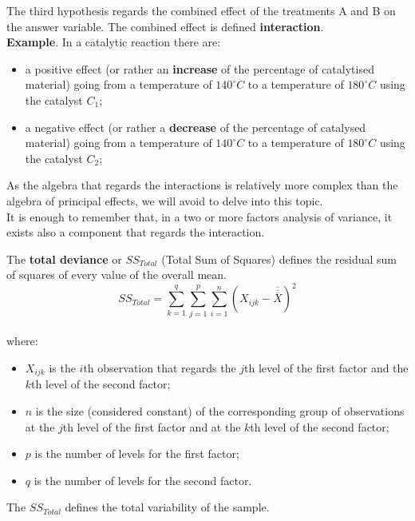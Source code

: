 \begin{frame}
  \begin{small}
    The third hypothesis regards the combined effect of the treatments A and B on the answer variable. The combined effect is defined \textbf{interaction}.\\
    \vspace*{.2cm}
    \textbf{Example}. In a catalytic reaction there are:
    \begin{itemize}
      \item a positive effect (or rather an \textbf{increase} of the percentage of catalytised material) going from a temperature of $140^\circ C$ to a temperature of $180^\circ C$ using the catalyst {\boldmath$C_1$};
      \vspace*{.2cm}
      \item a negative effect (or rather a \textbf{decrease} of the percentage of catalysed material)  going from a temperature of $140^\circ C$ to a temperature of $180^\circ C$ using the catalyst {\boldmath$C_2$};
    \end{itemize}
    \vspace*{.2cm}
    As the algebra that regards the interactions is relatively more complex than the algebra of principal effects, we will avoid to delve into this topic.\\
    \vspace*{.2cm}
    It is enough to remember that, in a two or more factors analysis of variance, it exists also a component that regards the interaction.
  \end{small}
\end{frame}


\begin{frame}
  \vspace*{.25cm} 
  The \textbf{total deviance} or {\boldmath$SS_{Total}$} (Total Sum of Squares) defines the residual sum of squares of every value of the overall mean.
  $$ SS_{Total} = \sum_{k=1}^q \sum_{j=1}^p \sum_{i=1}^{n}{(X_{ijk}-\overline{\overline{\overline{X}}})^2} $$ \\
  \vspace{-0.3cm}
  where:\\
  \vspace{-0.3cm}
  \begin{itemize}
    \item $ X_{ijk} $ is the $ i $th observation that regards the $ j $th level of the first factor and the $ k $th level of the second factor;
    \item $ n $ is the size (considered constant) of the corresponding group of observations at the $ j $th level of the first factor and at the $ k $th level of the second factor;
    \item $ p $ is the number of levels for the first factor;
    \item $ q $ is the number of levels for the second factor.
  \end{itemize}
  The {\boldmath$SS_{Total}$} defines the total variability of the sample.\\
\end{frame}

